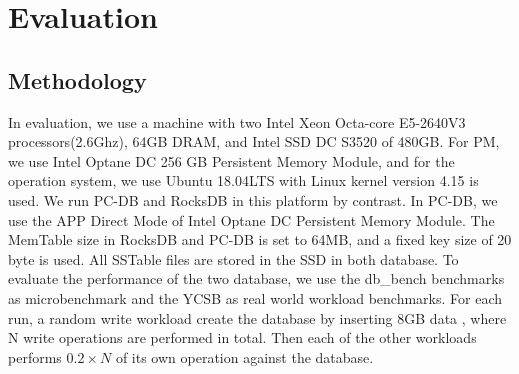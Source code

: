 \section{Evaluation}
\subsection{Methodology}
In evaluation, we use a machine with two Intel Xeon Octa-core E5-2640V3 processors(2.6Ghz), 64GB DRAM, and Intel SSD DC S3520 of 480GB. For PM, we use Intel Optane DC 256 GB Persistent Memory Module, and for the operation system, we use Ubuntu 18.04LTS with Linux kernel version 4.15 is used.
We run PC-DB and RocksDB in this platform by contrast. In PC-DB, we use the APP Direct Mode of Intel Optane DC Persistent Memory Module. The MemTable size in RocksDB and PC-DB is set to 64MB, and a fixed key size of 20 byte is used.  All SSTable files are stored in the SSD in both database. 
To evaluate the performance of the two database, we use the db\_bench benchmarks as microbenchmark and the YCSB as real world workload benchmarks. For each run, a random write workload create the database by inserting 8GB data , where N write operations are performed in total. Then each of the other workloads performs $0.2\times N$ of its own operation against the database.  
